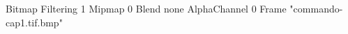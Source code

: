 {Bitmap
	{Filtering 1}
	{Mipmap 0}
	{Blend none}
	{AlphaChannel 0}
	{Frame "commando-cap1.tif.bmp"}
}
